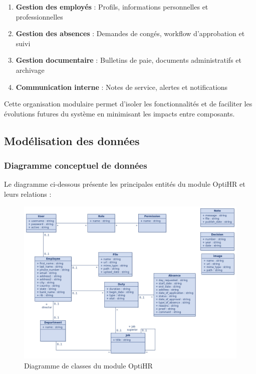 \begin{enumerate}
    \item \textbf{Gestion des employés} : Profils, informations personnelles et professionnelles
    \item \textbf{Gestion des absences} : Demandes de congés, workflow d'approbation et suivi
    \item \textbf{Gestion documentaire} : Bulletins de paie, documents administratifs et archivage
    \item \textbf{Communication interne} : Notes de service, alertes et notifications
\end{enumerate}


Cette organisation modulaire permet d'isoler les fonctionnalités et de faciliter les évolutions futures du système en minimisant les impacts entre composants.

\subsection{Modélisation des données}

\subsubsection{Diagramme conceptuel de données}
Le diagramme ci-dessous présente les principales entités du module OptiHR et leurs relations :

\begin{figure}[H]
    \centering
    \includegraphics[width=\textwidth]{images/diagrammes/class/diagramme.jpeg}
    \caption{Diagramme de classes du module OptiHR}
    \label{fig:class_diagram_optihr}
\end{figure}

